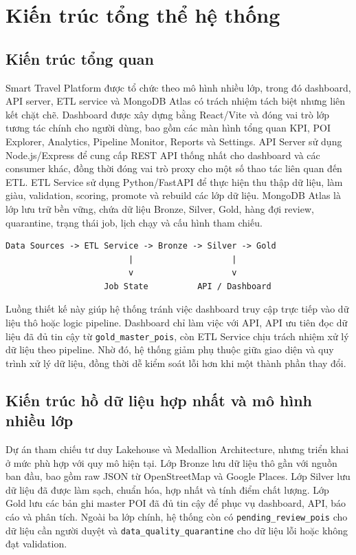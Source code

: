 \documentclass[12pt,a4paper]{article}
\begin{document}
\section{Kiến trúc tổng thể hệ thống}

\subsection{Kiến trúc tổng quan}

Smart Travel Platform được tổ chức theo mô hình nhiều lớp, trong đó dashboard, API server, ETL service và MongoDB Atlas có trách nhiệm tách biệt nhưng liên kết chặt chẽ. Dashboard được xây dựng bằng React/Vite và đóng vai trò lớp tương tác chính cho người dùng, bao gồm các màn hình tổng quan KPI, POI Explorer, Analytics, Pipeline Monitor, Reports và Settings. API Server sử dụng Node.js/Express để cung cấp REST API thống nhất cho dashboard và các consumer khác, đồng thời đóng vai trò proxy cho một số thao tác liên quan đến ETL. ETL Service sử dụng Python/FastAPI để thực hiện thu thập dữ liệu, làm giàu, validation, scoring, promote và rebuild các lớp dữ liệu. MongoDB Atlas là lớp lưu trữ bền vững, chứa dữ liệu Bronze, Silver, Gold, hàng đợi review, quarantine, trạng thái job, lịch chạy và cấu hình tham chiếu.

\begin{verbatim}
Data Sources -> ETL Service -> Bronze -> Silver -> Gold
                         |                    |
                         v                    v
                    Job State          API / Dashboard
\end{verbatim}

Luồng thiết kế này giúp hệ thống tránh việc dashboard truy cập trực tiếp vào dữ liệu thô hoặc logic pipeline. Dashboard chỉ làm việc với API, API ưu tiên đọc dữ liệu đã đủ tin cậy từ \texttt{gold\_master\_pois}, còn ETL Service chịu trách nhiệm xử lý dữ liệu theo pipeline. Nhờ đó, hệ thống giảm phụ thuộc giữa giao diện và quy trình xử lý dữ liệu, đồng thời dễ kiểm soát lỗi hơn khi một thành phần thay đổi.

\subsection{Kiến trúc hồ dữ liệu hợp nhất và mô hình nhiều lớp}

Dự án tham chiếu tư duy Lakehouse và Medallion Architecture, nhưng triển khai ở mức phù hợp với quy mô hiện tại. Lớp Bronze lưu dữ liệu thô gần với nguồn ban đầu, bao gồm raw JSON từ OpenStreetMap và Google Places. Lớp Silver lưu dữ liệu đã được làm sạch, chuẩn hóa, hợp nhất và tính điểm chất lượng. Lớp Gold lưu các bản ghi master POI đã đủ tin cậy để phục vụ dashboard, API, báo cáo và phân tích. Ngoài ba lớp chính, hệ thống còn có \texttt{pending\_review\_pois} cho dữ liệu cần người duyệt và \texttt{data\_quality\_quarantine} cho dữ liệu lỗi hoặc không đạt validation.
\end{document}
